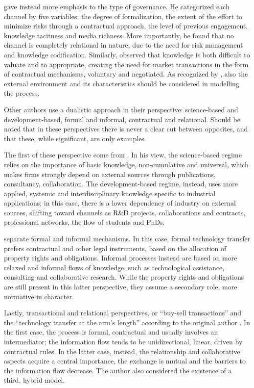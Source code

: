 \citet{Alexander2013} gave instead more emphasis to the type of governance. He categorized each channel by five variables: the degree of formalization, the extent of the effort to minimize risks through a contractual approach, the level of previous engagement, knowledge tacitness and media richness. More importantly, he found that no channel is completely relational in nature, due to the need for risk management and knowledge codification. Similarly, \citet{Bercovitz2006} observed that knowledge is both difficult to valuate and to appropriate, creating the need for market transactions in the form of contractual mechanisms, voluntary and negotiated. As recognized by \citet{Rogers2001}, also the external environment and its characteristics should be considered in modelling the process.

Other authors use a dualistic approach in their perspective: science-based and development-based, formal and informal, contractual and relational. Should be noted that in these perspectives there is never a clear cut between opposites, and that these, while significant, are only examples.

The first of these perspective come from \citet{Gilsing2011}. In his view, the science-based regime relies on the importance of basic knowledge, non-cumulative and universal, which makes firms strongly depend on external sources through publications, consultancy, collaboration. The development-based regime, instead, uses more applied, systemic and interdisciplinary knowledge specific to industrial applications; in this case, there is a lower dependency of industry on external sources, shifting toward channels as R\&D projects, collaborations and contracts, professional networks, the flow of students and PhDs. 

\citet{Link2007} separate formal and informal mechanisms. In this case, formal technology transfer prefers contractual and other legal instruments, based on the allocation of property rights and obligations. Informal processes instead are based on more relaxed and informal flows of knowledge, such as technological assistance, consulting and collaborative research. While the property rights and obligations are still present in this latter perspective, they assume a secondary role, more normative in character.

Lastly, transactional and relational perspectives, or \enquote{buy-sell transactions} and the \enquote{technology transfer at the arm's length} according to the original author \citep{Harmon1997}. In the first case, the process is formal, contractual and usually involves an intermediator; the information flow tends to be unidirectional, linear, driven by contractual rules. In the latter case, instead, the relationship and collaborative aspects acquire a central importance, the exchange is mutual and the barriers to the information flow decrease. The author also considered the existence of a third, hybrid model. 

